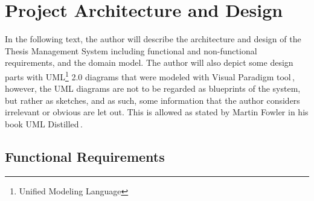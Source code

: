 \chapter{Project Architecture and Design}

In the following text, the author will describe the architecture and design of the Thesis Management System including functional and non-functional requirements, and the domain model. The author will also depict some design parts with UML\footnote{Unified Modeling Language} 2.0 diagrams that were modeled with Visual Paradigm tool\,\cite{visual-paradigm-homepage}, however, the UML diagrams are not to be regarded as blueprints of the system, but rather as sketches, and as such, some information that the author considers irrelevant or obvious are let out. This is allowed as stated by Martin Fowler in his book UML Distilled\,\cite{fowler-uml}.

\section{Functional Requirements}
\label{sec:func-requirements}

